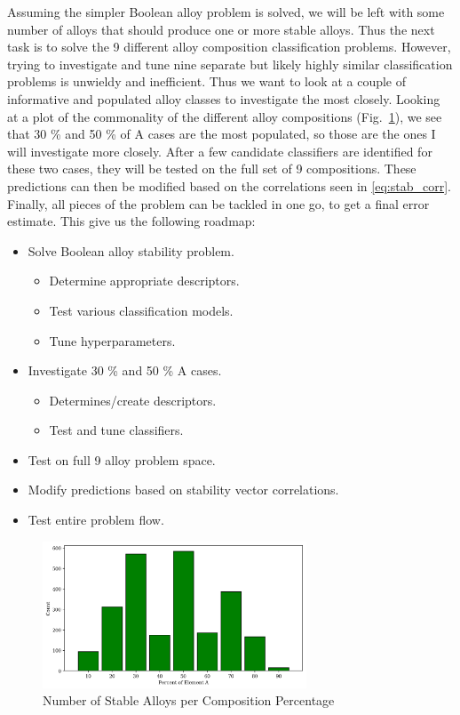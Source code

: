 \documentclass[11pt]{article}
\begin{document}
\noindent Assuming the simpler Boolean alloy problem is solved, we will be left with some number of alloys that should produce one or more stable alloys. Thus the next task is to solve the 9 different alloy composition classification problems. However, trying to investigate and tune nine separate but likely highly similar classification problems is unwieldy and inefficient. Thus we want to look at a couple of informative and populated alloy classes to investigate the most closely. Looking at a plot of the commonality of the different alloy compositions (Fig.~\ref{alloy_comp_hist}), we see that 30 \% and 50 \% of A cases are the most populated, so those are the ones I will investigate more closely. After a few candidate classifiers are identified for these two cases, they will be tested on the full set of 9 compositions. These predictions can then be modified based on the correlations seen in \eqref{eq:stab_corr}. Finally, all pieces of the problem can be tackled in one go, to get a final error estimate. This give us the following roadmap:
\begin{itemize}
\item Solve Boolean alloy stability problem.
\begin{itemize}
\item Determine appropriate descriptors.
\item Test various classification models.
\item Tune hyperparameters.
\end{itemize}
\item Investigate 30 \% and 50 \% A cases.
\begin{itemize}
\item Determines/create descriptors.
\item Test and tune classifiers.
\end{itemize}
\item Test on full 9 alloy problem space.
\item Modify predictions based on stability vector correlations. 
\item Test entire problem flow.
\end{itemize} 

\begin{figure}[H]
\centering
\includegraphics[width=0.7\textwidth]{alloy_composition_bar_chart.png}
\caption{Number of Stable Alloys per Composition Percentage}
\label{alloy_comp_hist}
\end{figure}
\end{document}
